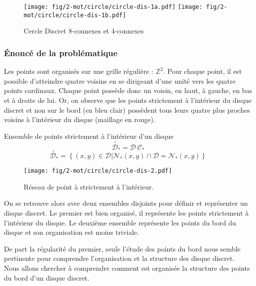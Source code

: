\begin{figure}[H]
  \centering
  \texttt{[image: fig/2-mot/circle/circle-dis-1a.pdf]}
  \texttt{[image: fig/2-mot/circle/circle-dis-1b.pdf]}
  \caption{Cercle Discret 8-connexes et 4-connexes}
\end{figure}


\subsubsection{Énoncé de la problématique}

Les points sont organisés sur une grille régulière : $\mathbb{Z}^{2}$. Pour chaque point, il est possible d'atteindre quatre voisins en se dirigeant d'une unité vers les quatre points cardinaux. Chaque point possède donc un voisin, en haut, à gauche, en bas et à droite de lui. Or, on observe que les points strictement à l'intérieur du disque discret et non sur le bord (en bleu clair) possèdent tous leurs quatre plus proches voisins à l'intérieur du disque (maillage en rouge).

\begin{Definition}{Ensemble de points strictement à l'intérieur d'un disque}
\label{def:int-ens}
  $$\stackrel{\ \circ}{\mathcal{D}}_{*} = \mathcal{D} \ \mathcal{C_{*}} $$
  $$ \stackrel{\ \circ}{\mathcal{D}}_{*} =  \left\{ (x,y) \in \mathcal{D} | \mathcal{N}_{*}(x,y) \cap \mathcal{D} = \mathcal{N}_{*}(x,y) \right\}$$
\end{Definition}

\begin{figure}[H]
  \centering
  \texttt{[image: fig/2-mot/circle/circle-dis-2.pdf]}
  \caption{Réseau de point à strictement à l'intérieur.}
\end{figure}

On se retrouve alors avec deux ensembles disjoints pour définir et représenter un disque discret. Le premier est bien organisé, il représente les points strictement à l'intérieur du disque. Le deuxième ensemble représente les points du bord du disque et son organisation est moins triviale. 

De part la régularité du premier, seule l'étude des points du bord nous semble pertinente pour comprendre l'organisation et la structure des disque discret.\\

Nous allons chercher à comprendre comment est organisée la structure des points du bord d'un disque discret.


